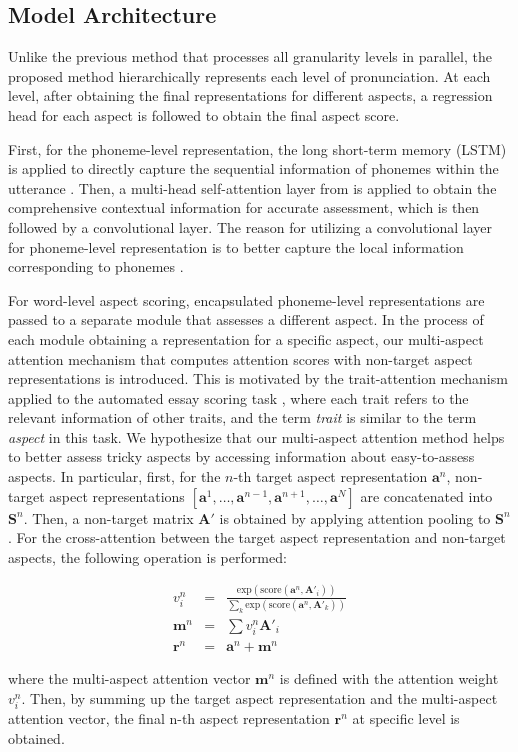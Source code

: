 \documentclass{article}
\begin{document}
\subsection{Model Architecture}
Unlike the previous method that processes all granularity levels in parallel, the proposed method hierarchically represents each level of pronunciation. At each level, after obtaining the final representations for different aspects, a regression head for each aspect is followed to obtain the final aspect score.

First, for the phoneme-level representation, the long short-term memory (LSTM) \cite{hochreiter1997long} is applied to directly capture the sequential information of phonemes within the utterance \cite{li2017improving}. Then, a multi-head self-attention layer from \cite{vaswani2017attention} is applied to obtain the comprehensive contextual information for accurate assessment, which is then followed by a convolutional layer. The reason for utilizing a convolutional layer for phoneme-level representation is to better capture the local information corresponding to phonemes \cite{lee2009unsupervised, lee2016language}.

For word-level aspect scoring, encapsulated phoneme-level representations are passed to a separate module that assesses a different aspect. In the process of each module obtaining a representation for a specific aspect, our multi-aspect attention mechanism that computes attention scores with non-target aspect representations is introduced. This is motivated by the trait-attention mechanism applied to the automated essay scoring task \cite{ridley2021automated}, where each trait refers to the relevant information of other traits, and the term \textit{trait} is similar to the term \textit{aspect} in this task. We hypothesize that our multi-aspect attention method helps to better assess tricky aspects by accessing information about easy-to-assess aspects. In particular, first, for the $n$-th target aspect representation $\mathbf{a}^{n}$, non-target aspect representations $[\mathbf{a}^1,\dots,\mathbf{a}^{n-1},\mathbf{a}^{n+1},\dots,\mathbf{a}^N]$ are concatenated into $\mathbf{S}^n$. Then, a non-target matrix $\mathbf{A'}$ is obtained by applying attention pooling \cite{dong2017attention} to $\mathbf{S}^n$. For the cross-attention between the target aspect representation and non-target aspects, the following operation is performed:
\begin{small}\begin{eqnarray}
v_i^n&=&\frac{\mathrm{exp}(\mathrm{score}(\mathbf{a}^n, \mathbf{A'}_i))}{\sum_k \mathrm{exp}(\mathrm{score}(\mathbf{a}^n, \mathbf{A'}_k))}\label{eq12}\\
\mathbf{m}^n&=&\sum v_i^n \mathbf{A'}_{i} \label{eq13} \\
\mathbf{r}^n&=& \mathbf{a}^n + \mathbf{m}^n \label{eq13} 
\end{eqnarray}\end{small}
where the multi-aspect attention vector $\mathbf{m}^n$ is defined with the attention weight $v_i^n$. Then, by summing up the target aspect representation and the multi-aspect attention vector, the final n-th aspect representation $\mathbf{r}^n$ at specific level is obtained.
\end{document}

